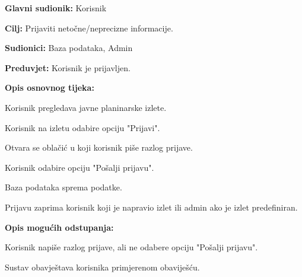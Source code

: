 		\noindent {}
		\begin{packed_item}
			
			\item \textbf{Glavni sudionik: } Korisnik
			\item  \textbf{Cilj:} Prijaviti netočne/neprecizne informacije.
			\item  \textbf{Sudionici:} Baza podataka, Admin
			\item  \textbf{Preduvjet:} Korisnik je prijavljen.
			\item  \textbf{Opis osnovnog tijeka:}
			
			\item[] \begin{packed_enum}
				
				\item Korisnik pregledava javne planinarske izlete.
				\item Korisnik na izletu odabire opciju "Prijavi".
				\item Otvara se oblačić u koji korisnik piše razlog prijave.
				\item Korisnik odabire opciju "Pošalji prijavu".
				\item Baza podataka sprema podatke.
				\item Prijavu zaprima korisnik koji je napravio izlet ili admin ako je izlet predefiniran.
				
			\end{packed_enum}
			
			\item  \textbf{Opis mogućih odstupanja:}
			
			\item[] \begin{packed_item}
				
				\item[3.a] Korisnik napiše razlog prijave, ali ne odabere opciju "Pošalji prijavu". 
				\item[] \begin{packed_enum}
					
					\item Sustav obavještava korisnika primjerenom obaviješću.
				\end{packed_enum}
				
				
			\end{packed_item}
		\end{packed_item}
		
